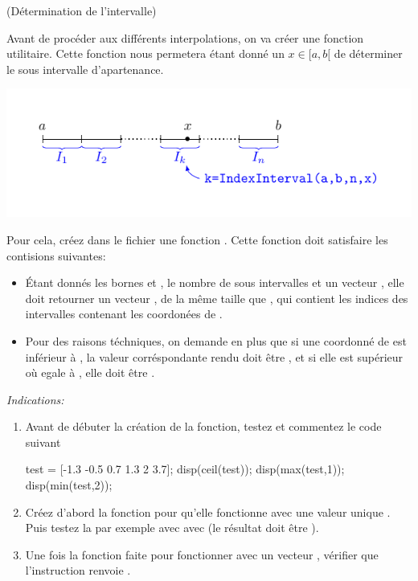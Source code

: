 \documentclass[a4paper,12pt,reqno]{amsart}
\begin{document}
\setcounter{numeroexo}{-1} %
\begin{exo} (Détermination de l'intervalle)

  Avant de procéder aux différents interpolations, on va créer une fonction utilitaire. Cette fonction nous permetera étant donné un $x \in [a,b[$ de déterminer le sous intervalle d'apartenance.

\begin{center}
  \includegraphics[width=15cm]{IndexInterval}
\end{center}

  Pour cela, créez dans le fichier  une fonction . Cette fonction doit satisfaire les contisions suivantes:
  \begin{itemize}
    \item Étant donnés les bornes  et , le nombre de sous intervalles  et un vecteur , elle doit retourner un vecteur , de la même taille que , qui contient les indices des intervalles contenant les coordonées de .

    \item Pour des raisons téchniques, on demande en plus que si une coordonné de  est inférieur à , la valeur corréspondante rendu doit être , et si elle est supérieur où egale à , elle doit être .
  \end{itemize}

  \textit{Indications:}
  \begin{enumerate}
    \item Avant de débuter la création de la fonction, testez et commentez le code suivant
    \begin{matlab}
      test = [-1.3 -0.5 0.7 1.3 2 3.7];
      disp(ceil(test));
      disp(max(test,1));
      disp(min(test,2));
    \end{matlab}

    \item Créez d'abord la fonction pour qu'elle fonctionne avec une valeur unique . Puis testez la par exemple avec avec  (le résultat doit être ).

    \item Une fois la fonction faite pour fonctionner avec un vecteur , vérifier que l'instruction  renvoie .
  \end{enumerate}

\end{exo}
\end{document}
